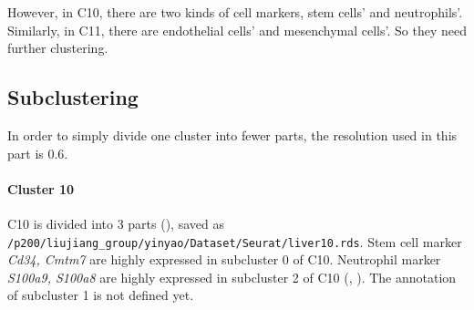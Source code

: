 \documentclass[lang=en]{elegantpaper}
\begin{document}
However, in C10, there are two kinds of cell markers, stem cells' and neutrophils'. Similarly, in C11, there are endothelial cells' and mesenchymal cells'. So they need further clustering.

\subsection{Subclustering}

In order to simply divide one cluster into fewer parts, the resolution used in this part is 0.6. 

\paragraph{Cluster 10} C10 is divided into 3 parts (), saved as \lstinline{/p200/liujiang_group/yinyao/Dataset/Seurat/liver10.rds}. Stem cell marker \emph{Cd34, Cmtm7}\citep{han_mapping_2018} are highly expressed in subcluster 0 of C10. Neutrophil marker \emph{S100a9, S100a8}\citep{han_mapping_2018} are highly expressed in subcluster 2 of C10 (, ). The annotation of subcluster 1 is not defined yet.
\end{document}
